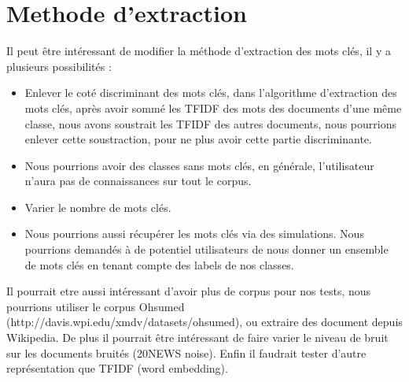 \documentclass[a4paper]{article}
\begin{document}
\section{Methode d'extraction}
Il peut être intéressant de modifier la méthode d'extraction des mots clés,
il y a plusieurs possibilités :
\begin{itemize}
\item Enlever le coté discriminant des mots clés, dans l'algorithme d'extraction des mots clés,
après avoir sommé les TFIDF des mots des documents d'une même classe, nous avons soustrait les 
TFIDF des autres documents, nous pourrions enlever cette soustraction, pour ne plus avoir cette
partie discriminante.
\item Nous pourrions avoir des classes sans mots clés, en générale, l'utilisateur n'aura pas
de connaissances sur tout le corpus.
\item Varier le nombre de mots clés.
\item Nous pourrions aussi récupérer les mots clés via des simulations. Nous pourrions demandés à 
de potentiel utilisateurs de nous donner un ensemble de mots clés en tenant compte des labels de nos
classes. 
\end{itemize}
Il pourrait etre aussi intéressant d'avoir plus de corpus pour nos tests, nous pourrions utiliser 
le corpus Ohsumed (http://davis.wpi.edu/xmdv/datasets/ohsumed), ou extraire des document depuis
Wikipedia. De plus il pourrait être intéressant de faire varier le niveau de bruit sur les documents
bruités (20NEWS noise). Enfin il faudrait tester d'autre représentation que TFIDF (word embedding).
\end{document}

